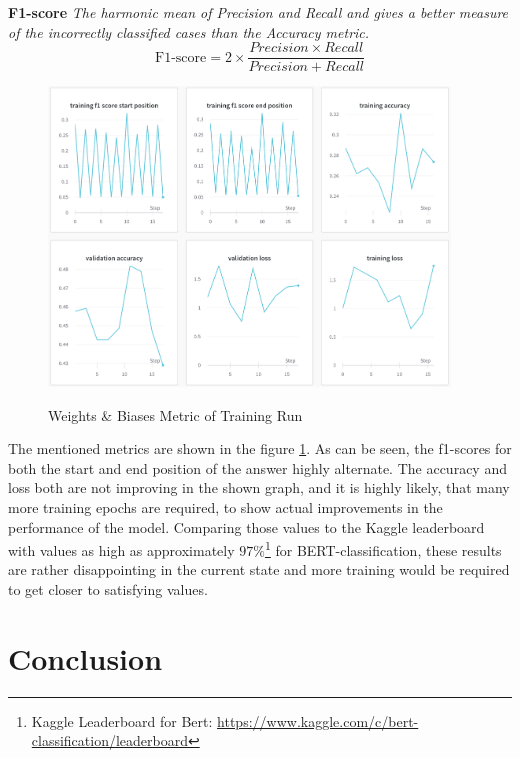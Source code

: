         \begin{tcolorbox}
            \textbf{F1-score}
            \textit{The harmonic mean of Precision and Recall and gives a better measure of the incorrectly classified cases than the Accuracy metric.}
            $$\text{F1-score} = 2 \times \frac{Precision \times Recall}{Precision + Recall}$$
        \end{tcolorbox}
   
        \begin{figure}[h!]
            \centering
            \caption{Weights \& Biases Metric of Training Run \cite{wandbScreenshot}}
            \includegraphics[width=0.95\textwidth]{figures/wandb_metrics.png}
            \label{fig:-wandb-metric}
        \end{figure}
        The mentioned metrics are shown in the figure \ref{fig:-wandb-metric}.
        As can be seen, the f1-scores for both the start and end position of the answer highly alternate. The accuracy and loss both are not improving in the shown graph, and it is highly likely, that many more training epochs are required, to show actual improvements in the performance of the model.
        Comparing those values to the Kaggle leaderboard with values as high as approximately $97\%$\footnote{Kaggle Leaderboard for Bert: \url{https://www.kaggle.com/c/bert-classification/leaderboard}} for BERT-classification, these results are rather disappointing in the current state and more training would be required to get closer to satisfying values.


\pagebreak
    \section{Conclusion}
    \label{sec:conclusion}

